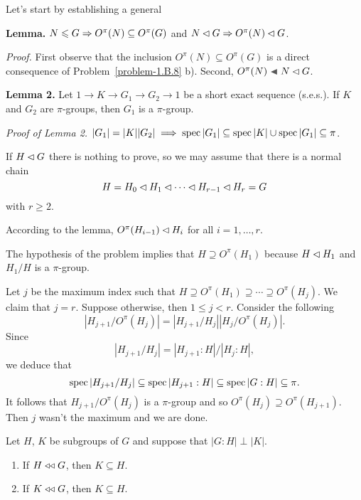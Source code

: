 \begin{solution} Let's start by establishing a general

\textbf{Lemma.} $N\leqslant G \Rightarrow O^\pi(N)\subseteq O^\pi(G)$ and $N\lhd G \Rightarrow O^\pi(N)\lhd G$.

\textit{Proof.} First observe that the inclusion $O^\pi(N)\subseteq O^\pi(G)$ is a direct consequence of Problem~\ref{problem-1.B.8} b). Second, $O^\pi(N)\ch N\normal G$.

    \textbf{Lemma 2.} Let $1\to K\to G_1\to G_2\to 1$ be a short exact sequence (s.e.s.). If $K$ and $G_2$ are $\pi$-groups, then $G_1$ is a $\pi$-group.
    
    \textit{Proof of\/ \rm Lemma 2.} $|G_1|=|K||G_2|\implies \operatorname{spec}|G_1|\subseteq\operatorname{spec}|K|\cup\operatorname{spec}|G_1|\subseteq\pi$.
\fi

\medskip

If $H\lhd G$ there is nothing to prove, so we may assume that there is a normal chain
$$
    H = H_0\lhd H_1\lhd\cdots\lhd H_{r-1}\lhd H_r=G
$$
with $r\ge2$.

According to the lemma, $O^\pi(H_{i-1})\lhd H_i$ for all $i=1,\dots,r$. 

The hypothesis of the problem implies that $H\supseteq O^\pi(H_1)$ because $H\lhd H_1$ and $H_1/H$ is a $\pi$-group.

Let $j$ be the maximum index such that $H\supseteq O^\pi(H_1)\supseteq\cdots\supseteq O^\pi(H_j)$. We claim that $j=r$. Suppose otherwise, then $1\le j<r$. Consider the following
$$
    |H_{j+1}/O^\pi(H_j)|=|H_{j+1}/H_j||H_j/O^\pi(H_j)|.
$$
Since
$$
    |H_{j+1}/H_j| = |H_{j+1}:H|/|H_j:H|,
$$
we deduce that
$$
    \operatorname{spec}|H_{j+1}/H_j| \subseteq\operatorname{spec}|H_{j+1}:H|
        \subseteq\operatorname{spec}|G:H|\subseteq\pi.
$$
It follows that $H_{j+1}/O^\pi(H_j)$ is a $\pi$-group and so $O^\pi(H_j)\supseteq O^\pi(H_{j+1})$. Then $j$ wasn't the maximum and we are done.  \end{solution}


\begin{probl}\label{problem-2.A.3}
    Let\/ $H$, $K$ be subgroups of $G$ and suppose that $|G:H|\perp|K|$.
    \begin{enumerate}[\rm a)]
    \item If $H \mathrel{\triangleleft\triangleleft} G$, then $K \subseteq H$.
    \item If $K \mathrel{\triangleleft\triangleleft} G$, then $K \subseteq H$.
    \end{enumerate}
\end{probl}

